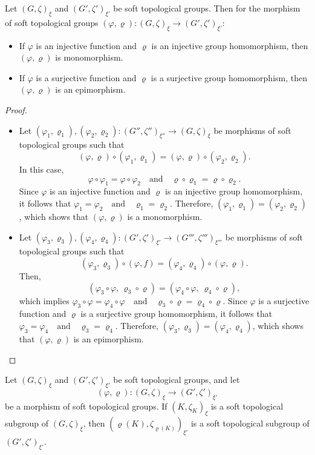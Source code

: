 \documentclass[preprint,12pt]{elsarticle}
\begin{document}
\begin{prop}
Let $(G,\zeta)_\xi  $ and $( G',\zeta')_{\xi'}$ be soft topological groups.
Then for the morphism of soft topological groups $(\varphi, \varrho) : (G,\zeta)_\xi  \to ( G',\zeta')_{\xi'}$:

\begin{itemize}
  \item[(i)] If $\varphi$ is an  injective function and $\varrho$ is an injective group homomorphism, then $(\varphi, \varrho)$ is monomorphism.
  \item[(ii)] If $\varphi$ is a surjective function and $\varrho$ is a surjective group homomorphism, then $(\varphi, \varrho)$ is an epimorphism.

\end{itemize}
\end{prop}
\begin{proof}

\begin{itemize}
\item [(i)] Let $(\varphi_1, \varrho_1),(\varphi_2, \varrho_2):(G'',\zeta'')_{\xi''}   \rightarrow  (G,\zeta)_\xi $ be morphisms of soft topological groups such that
\[
(\varphi, \varrho) \circ (\varphi_1, \varrho_1) = (\varphi, \varrho) \circ (\varphi_2, \varrho_2).
\]
In this case,
\[\varphi\circ \varphi_1 =\varphi \circ\varphi_2 \quad \text{and} \quad \varrho \circ \varrho_1 = \varrho \circ \varrho_2.\]
Since $\varphi$ is an injective function and $\varrho$ is an injective group homomorphism, it follows that
\(\varphi_1 = \varphi_2 \quad \text{and} \quad \varrho_1 = \varrho_2.\)
Therefore, $(\varphi_1, \varrho_1) = (\varphi_2, \varrho_2)$, which shows that $(\varphi, \varrho)$ is a monomorphism.
\item[(ii)] Let $(\varphi_3,\varrho_3),(\varphi_4,\varrho_4):(G',\zeta')_{\xi'}  \rightarrow  (G''',\zeta''')_{\xi'''}  $ be morphisms of soft topological groups such that \[(\varphi_3, \varrho_3) \circ (\varphi, f) = (\varphi_4, \varrho_4) \circ (\varphi, \varrho).\] Then, \[(\varphi_3 \circ \varphi, \, \varrho_3 \circ \varrho) = (\varphi_4 \circ \varphi, \ \varrho_4 \circ \varrho),
\]
which implies \(
\varphi_3 \circ \varphi = \varphi_4\circ \varphi \quad \text{and} \quad \varrho_3 \circ \varrho = \varrho_4 \circ \varrho.\)
Since $\varphi$ is a surjective function and $\varrho$ is a surjective group homomorphism, it follows that \(\varphi_3 = \varphi_4\quad \text{and} \quad \varrho_3 = \varrho_4.\)
Therefore, $(\varphi_3, \varrho_3) = (\varphi_4, \varrho_4)$, which shows that $(\varphi, \varrho)$ is an epimorphism.
\end{itemize}
\end{proof}
\begin{thm}
Let $(G,\zeta)_\xi $ and $(G',\zeta')_{\xi'} $ be soft topological groups, and let
\[
(\varphi,\varrho)\colon (G,\zeta)_\xi\to (G',\zeta')_{\xi'}
\]
be a morphism of soft topological groups. If $(K,\zeta_K)_\xi$ is a soft topological subgroup of $(G,\zeta)_\xi$, then
$ (\varrho(K),\zeta_{\varrho(K)})_{\xi'} $
is a soft topological subgroup of $(G',\zeta')_{\xi'}$.
\end{thm}
\end{document}
